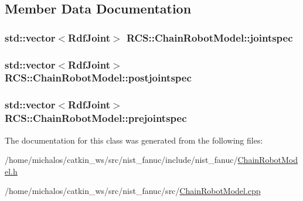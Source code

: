 \subsection{Member Data Documentation}
\hypertarget{classRCS_1_1ChainRobotModel_aeac2fe8d84501b374bc2f6170bf751ae}{
\subsubsection[{jointspec}]{\setlength{\rightskip}{0pt plus 5cm}std\-::vector$<${\bf Rdf\-Joint}$>$ R\-C\-S\-::\-Chain\-Robot\-Model\-::jointspec}}\label{classRCS_1_1ChainRobotModel_aeac2fe8d84501b374bc2f6170bf751ae}
\hypertarget{classRCS_1_1ChainRobotModel_a6f2304b0bc530b4a2f67b9932808f510}{
\subsubsection[{postjointspec}]{\setlength{\rightskip}{0pt plus 5cm}std\-::vector$<${\bf Rdf\-Joint}$>$ R\-C\-S\-::\-Chain\-Robot\-Model\-::postjointspec}}\label{classRCS_1_1ChainRobotModel_a6f2304b0bc530b4a2f67b9932808f510}
\hypertarget{classRCS_1_1ChainRobotModel_af7951f5cf300a83c4a5bbe5ef0c42ad1}{
\subsubsection[{prejointspec}]{\setlength{\rightskip}{0pt plus 5cm}std\-::vector$<${\bf Rdf\-Joint}$>$ R\-C\-S\-::\-Chain\-Robot\-Model\-::prejointspec}}\label{classRCS_1_1ChainRobotModel_af7951f5cf300a83c4a5bbe5ef0c42ad1}


The documentation for this class was generated from the following files\-:\begin{DoxyCompactItemize}
\item 
/home/michalos/catkin\-\_\-ws/src/nist\-\_\-fanuc/include/nist\-\_\-fanuc/\hyperlink{ChainRobotModel_8h}{Chain\-Robot\-Model.\-h}\item 
/home/michalos/catkin\-\_\-ws/src/nist\-\_\-fanuc/src/\hyperlink{ChainRobotModel_8cpp}{Chain\-Robot\-Model.\-cpp}\end{DoxyCompactItemize}
